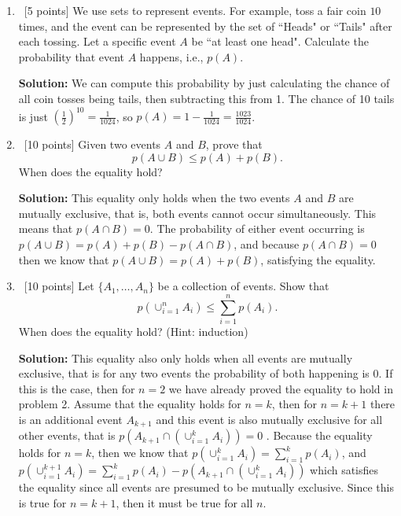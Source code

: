 \documentclass[12pt, fullpage,letterpaper]{article}
\begin{document}
%
\begin{enumerate}
\item~[5 points] We use sets to represent events. For example, toss a fair coin $10$ times, and the event can be represented by the set of ``Heads" or ``Tails" after each tossing. Let a specific event $A$ be ``at least one head". Calculate the probability that event $A$ happens, i.e., $p(A)$.

\textbf{Solution:} We can compute this probability by just calculating the chance of all coin tosses being tails, then subtracting this from 1. The chance of 10 tails is just $(\frac{1}{2})^{10} = \frac{1}{1024}$, so $p(A) = 1 - \frac{1}{1024} = \frac{1023}{1024}$.

\item~[10 points] Given two events $A$ and $B$, prove that 
\[
p(A \cup B) \le p(A) + p(B).
\]
When does the equality hold?

\textbf{Solution:} This equality only holds when the two events $A$ and $B$ are mutually exclusive, that is, both events cannot occur simultaneously. This means that $p(A \cap B) = 0$. The probability of either event occurring is $p(A \cup B) = p(A) + p(B) - p(A \cap B)$, and because $p(A \cap B) = 0$ then we know that $p(A \cup B) = p(A) + p(B)$, satisfying the equality.

\item~[10 points] Let $\{A_1, \ldots, A_n\}$ be a collection of events. Show that
\[
p(\cup_{i=1}^n A_i) \le \sum_{i=1}^n p(A_i).
\]
When does the equality hold? (Hint: induction)

\textbf{Solution:} This equality also only holds when all events are mutually exclusive, that is for any two events the probability of both happening is 0. If this is the case, then for $n=2$ we have already proved the equality to hold in problem 2. Assume that the equality holds for $n=k$, then for $n=k+1$ there is an additional event $A_{k+1}$ and this event is also mutually exclusive for all other events, that is $p(A_{k+1} \cap (\cup^k_{i=1} A_i)) = 0$ . Because the equality holds for $n=k$, then we know that $p(\cup^k_{i=1} A_i) = \sum^k_{i=1} p(A_i)$, and $p(\cup^{k+1}_{i=1} A_i) = \sum^k_{i=1} p(A_i) - p(A_{k+1} \cap (\cup^k_{i=1} A_i))$ which satisfies the equality since all events are presumed to be mutually exclusive. Since this is true for $n=k+1$, then it must be true for all $n$.


\end{enumerate}
\end{document}
